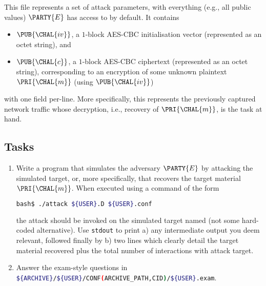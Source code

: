 \documentclass[crop={false},multi={true},tikz={true}]{standalone}
\begin{document}
This file represents a set of attack parameters, with everything (e.g.,
all public values) $\PARTY{E}$ has access to by default.  It contains 

\begin{itemize}
\item $\PUB{\CHAL{iv}}$,
      a  ${1}$-block AES-CBC initialisation vector
      (represented as an           octet string),
      and
\item $\PUB{\CHAL{c}}$,
      a  ${1}$-block AES-CBC ciphertext 
      (represented as an           octet string),
      corresponding to an encryption of some unknown plaintext 
      $\PRI{\CHAL{m}}$ (using $\PUB{\CHAL{iv}}$)
\end{itemize}

\noindent
with one field per-line.
More specifically, this represents the previously captured network traffic
whose decryption, i.e., recovery of $\PRI{\CHAL{m}}$, is the task at hand.
%

\subsection{Tasks}

\begin{enumerate}
\item Write a program that simulates the adversary $\PARTY{E}$ by attacking
      the simulated target, or, more specifically, that recovers the target 
      material $\PRI{\CHAL{m}}$.  
      When executed using a command of the form

      \begin{lstlisting}[language={bash},gobble={6}]
      bash$ ./attack ${USER}.D ${USER}.conf
      \end{lstlisting}

      \noindent
      the attack should be invoked on the simulated target named (not some
      hard-coded alternative).  Use \lstinline[language={bash}]{stdout} to 
      print 
      a) any intermediate output you deem relevant, followed finally by 
      b) two lines which clearly detail the target material recovered plus
         the total number of interactions with attack target.
\item Answer the exam-style questions in 
      \lstinline[language={bash}]|${ARCHIVE}/${USER}/CONF(ARCHIVE_PATH,CID)/${USER}.exam|.
\end{enumerate}


\ifstandalone
\printbibliography
\fi
\end{document}
